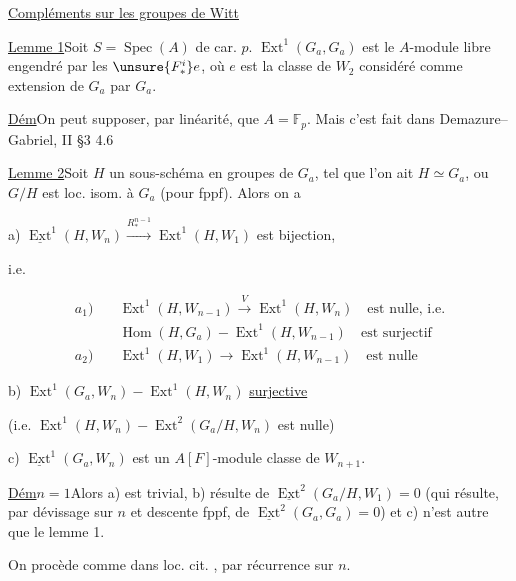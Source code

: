 \uline{Compléments sur les groupes de Witt}

\uline{Lemme 1}\quad Soit $S=\operatorname{Spec}(A)$ de car. $p$.
\deleted{Posons $\unsure{A[F]=\mathbb F_p[F}$}
$\operatorname{Ext}^1(G_a,G_a)$ est le
 $A$-module libre engendré par les
$\unsure{F_*^i}e$,
où $e$ est la classe de $W_2$ considéré comme extension de $G_a$ par $G_a$.

\uline{Dém}\quad On peut supposer, par linéarité, que $A=\mathbb F_p$.
Mais c'est fait dans Demazure--Gabriel, II \S 3 4.6

\uline{Lemme 2}\quad Soit $H$ un sous-schéma en groupes de $G_a$, tel
 que l'on ait $H\simeq G_a$, ou
$G/H$ est loc. isom. à $G_a$ (pour fppf).
Alors on a

a) $\underline{\operatorname{Ext}}^1(H,W_n)
\xrightarrow{R_*^{n-1}}\operatorname{Ext}^1(H,W_1)$ est bijection,

i.e. 

\[
\begin{aligned}
a_1)\quad&
\operatorname{Ext}^1(H,W_{n-1})\xrightarrow{V}\operatorname{Ext}^1(H,W_n)
\quad\text{est nulle, i.e.}\\
&\operatorname{Hom}(H,G_a)-\operatorname{Ext}^1(H,W_{n-1})
\quad\text{est surjectif}\\
a_2)\quad&
\operatorname{Ext}^1(H,W_1)\longrightarrow\operatorname{Ext}^1(H,W_{n-1})
\quad\text{est nulle}
\end{aligned}
\]

b) $\operatorname{Ext}^1(G_a,W_n)-\operatorname{Ext}^1(H,W_n)$
\uline{surjective}

(i.e. $\operatorname{Ext}^1(H,W_n)-\operatorname{Ext}^2(G_a/H,W_n)$
est nulle)

c) $\underline{\operatorname{Ext}}^1(G_a,W_n)$ est un $A[F]$-module
classe  de $W_{n+1}$.

\uline{Dém}\quad \uline{$n=1$}\quad Alors a) est trivial,
b) résulte de $\underline{\operatorname{Ext}}^2(G_a/H,W_1)=0$
(qui résulte, par dévissage sur $n$ et descente fppf, de
$\underline{\operatorname{Ext}}^2(G_a,G_a)=0$)
et c) n'est autre que le lemme 1.

On procède comme dans  loc. cit.
, par récurrence sur $n$.
